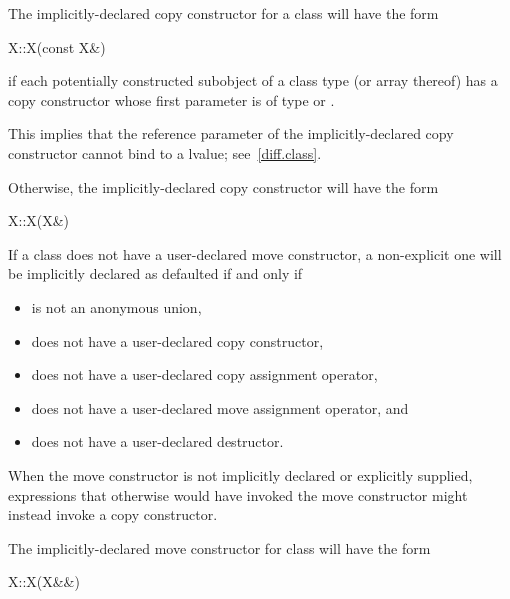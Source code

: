 \pnum
The implicitly-declared copy constructor for a class
will have the form
\begin{codeblock}
X::X(const X&)
\end{codeblock}
if each potentially constructed subobject of a class type
(or array thereof)
has a copy constructor whose first parameter is of type
or
.
\begin{footnote}
This implies that the reference parameter of the
implicitly-declared copy constructor
cannot bind to a
lvalue; see~\ref{diff.class}.
\end{footnote}
Otherwise, the implicitly-declared copy constructor will have the form
\begin{codeblock}
X::X(X&)
\end{codeblock}

\pnum
{}%
If a class  does not have
a user-declared move constructor, a non-explicit one will be
implicitly declared as defaulted if and only if
\begin{itemize}
\item
{} is not an anonymous union,

\item
{} does not have a user-declared copy constructor,

\item
{} does not have a user-declared copy assignment operator,

\item
{} does not have a user-declared move assignment operator, and

\item
{} does not have a user-declared destructor.
\end{itemize}

\begin{note}
When the move constructor is not implicitly declared or explicitly supplied,
expressions that otherwise would have invoked the move constructor might instead invoke
a copy constructor.
\end{note}

\pnum
The implicitly-declared move constructor for class  will have the form
\begin{codeblock}
X::X(X&&)
\end{codeblock}

